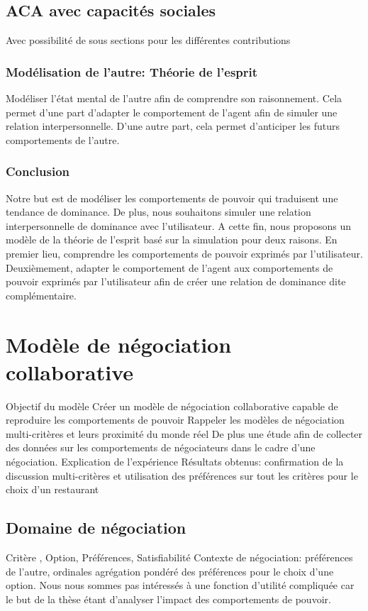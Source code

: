 \documentclass [french]{article}
\begin{document}
			\subsection{ACA avec capacités sociales}
				Avec possibilité de sous sections pour les différentes contributions
			\subsubsection{Modélisation de l'autre: Théorie de l'esprit} Modéliser l'état mental de l'autre afin de comprendre son raisonnement. Cela permet d'une part d'adapter le comportement de l'agent afin de simuler une relation interpersonnelle. D'une autre part, cela permet d'anticiper les futurs comportements de l'autre. 
		
		\subsubsection{Conclusion}
		
			Notre but est de modéliser les comportements de pouvoir qui traduisent une tendance de dominance. De plus, nous souhaitons simuler une relation interpersonnelle de dominance avec l'utilisateur. A cette fin, nous proposons un modèle de la théorie de l'esprit basé sur la simulation  pour deux raisons. En premier lieu, comprendre les comportements de pouvoir exprimés par l'utilisateur. Deuxièmement, adapter le comportement de l'agent aux comportements de pouvoir exprimés par l'utilisateur afin de créer une relation de dominance dite complémentaire. 	
			
	

		
		\section{Modèle de négociation collaborative}
			Objectif du modèle 
			Créer un modèle de négociation collaborative capable de reproduire les comportements de pouvoir
			Rappeler les modèles de négociation multi-critères et leurs proximité du monde réel
			De plus une étude afin de collecter des données sur les comportements de négociateurs dans le cadre d'une négociation.
				Explication de l'expérience
				Résultats obtenus: confirmation de la discussion multi-critères et utilisation des préférences  sur tout les critères pour le choix d'un restaurant
			
			\subsection{Domaine de négociation }
				 Critère , Option, Préférences, Satisfiabilité
				Contexte de négociation: préférences de l'autre, ordinales
				agrégation pondéré des préférences pour le choix d'une option. Nous nous sommes pas intéressés à une fonction d'utilité compliquée car le but de la thèse étant d'analyser l'impact des comportements de pouvoir.
				
\end{document}
